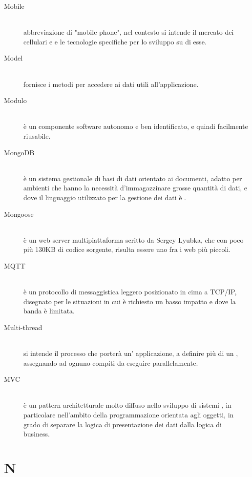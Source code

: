 \documentclass[12pt,a4paper]{article}
\begin{document}
\begin{description}
\item[Mobile] 
\hfill\\ abbreviazione di "mobile phone", nel contesto si intende il mercato dei cellulari e  e le tecnologie specifiche per lo sviluppo su di esse.

\item[Model] 
\hfill\\ fornisce i metodi per accedere ai dati utili all'applicazione.

\item[Modulo] 
\hfill\\ è un componente software autonomo e ben identificato, e quindi facilmente riusabile.

\item[MongoDB] 
\hfill\\ è un sistema gestionale di basi di dati  orientato ai documenti, adatto per ambienti che hanno la necessità d'immagazzinare grosse quantità di dati, e dove il linguaggio utilizzato per la gestione dei dati è .

\item[Mongoose] 
\hfill\\ è un web server multipiattaforma scritto da Sergey Lyubka, che con poco più 130KB di codice sorgente, risulta essere uno fra i  web più piccoli.

\item[MQTT] 
\hfill\\ è un protocollo di messaggistica leggero posizionato in cima a TCP/IP, disegnato per le situazioni in cui è richiesto un basso impatto e dove la banda è limitata.

\item[Multi-thread] 
\hfill\\ si intende il processo che porterà un' applicazione, a definire più di un , assegnando ad ognuno compiti da eseguire parallelamente.

\item[MVC] 
\hfill\\ è un pattern architetturale molto diffuso nello sviluppo di sistemi , in particolare nell'ambito della programmazione orientata agli oggetti, in grado di separare la logica di presentazione dei dati dalla logica di business.
\end{description}

\newpage

\section{N}
\end{document}
